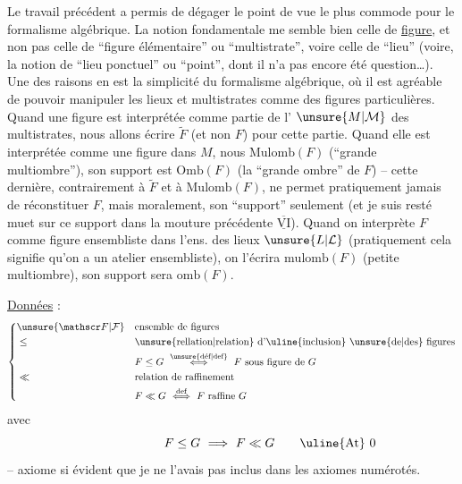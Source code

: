 Le travail précédent a permis de dégager le point de vue le plus commode pour le formalisme algébrique. La notion fondamentale me semble bien celle de \uline{figure}, et non pas celle de ``figure élémentaire'' ou ``multistrate'', voire celle de ``lieu'' (voire, la notion de ``lieu ponctuel'' ou ``point'', dont il n'a pas encore été question\ldots). Une des raisons en est la simplicité du formalisme algébrique,
%
 où il est agréable de pouvoir manipuler les lieux et multistrates comme  des figures particulières. Quand une figure  est interprétée  comme partie de l' $\unsure{M|\mathcal M}$  des multistrates, nous allons écrire $\widetilde F$ (et non $F$) pour cette partie. Quand elle est interprétée comme une figure  dans $M$, nous  $\mathrm{Mulomb}(F)$ (``grande multiombre''), son support est $\mathrm{Omb}(F)$ (la ``grande ombre'' de $F$) -- cette dernière, contrairement à $\widetilde F$ et à $\mathrm{Mulomb}(F)$, ne permet pratiquement jamais de réconstituer $F$,  mais moralement, son ``support'' seulement
(et je suis resté muet sur ce support dans la mouture précédente  $\underline{\overline{\mathrm{VI}}}$). Quand on interprète $F$ comme figure ensembliste dans l'ens. des lieux $\unsure{L|\mathcal L}$  (pratiquement cela signifie qu'on a un atelier ensembliste), on l'écrira $\mathrm{mulomb}(F)$ (petite multiombre), son support sera $\mathrm{omb}(F)$.

\uline{Données} \uline{ } :
\[
\left\{\begin{aligned}
&\unsure{\mathscr F|\mathcal F} &&\text{ensemble de figures}\\
&\leq &&\text{\unsure{rellation|relation} d'\uline{inclusion} \unsure{de|des} figures}\\
& &&F\leq G\ \overset{\text{\unsure{déf|def}}}{\Longleftrightarrow}\ F\ \text{sous figure de }G\\
&\ll &&\text{relation de raffinement}\\
& && F\ll G\ \overset{\text{def}}{\Longleftrightarrow}\ F\ \text{raffine }G
\end{aligned}\right.
\]
avec
\[
F\leq G\ \Longrightarrow\ F\ll G\tag*{\makebox[0pt][r]{\makebox[\displaywidth][l]{\uline{At} 0}}}
\]
-- axiome si évident que je ne l'avais pas inclus dans les axiomes numérotés.

